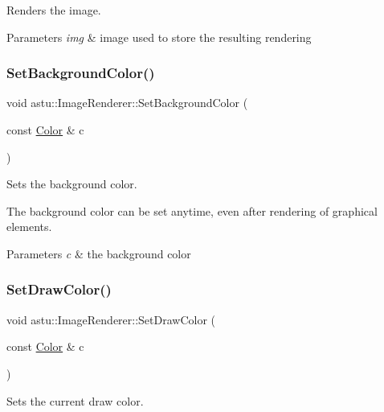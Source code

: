 Renders the image.


\begin{DoxyParams}{Parameters}
{\em img} & image used to store the resulting rendering \\
\hline
\end{DoxyParams}
\mbox{\label{classastu_1_1ImageRenderer_acfb25962b67295325e9209759fcabe2b}} 
\subsubsection{\texorpdfstring{Set\+Background\+Color()}{SetBackgroundColor()}}
{\footnotesize\ttfamily void astu\+::\+Image\+Renderer\+::\+Set\+Background\+Color (\begin{DoxyParamCaption}\item[{const \hyperlink{classastu_1_1Color}{Color} \&}]{c }\end{DoxyParamCaption})}

Sets the background color.

The background color can be set anytime, even after rendering of graphical elements.


\begin{DoxyParams}{Parameters}
{\em c} & the background color \\
\hline
\end{DoxyParams}
\mbox{\label{classastu_1_1ImageRenderer_a902cdac5634067b5e78de3f91667d1b9}} 
\subsubsection{\texorpdfstring{Set\+Draw\+Color()}{SetDrawColor()}}
{\footnotesize\ttfamily void astu\+::\+Image\+Renderer\+::\+Set\+Draw\+Color (\begin{DoxyParamCaption}\item[{const \hyperlink{classastu_1_1Color}{Color} \&}]{c }\end{DoxyParamCaption})}

Sets the current draw color.

